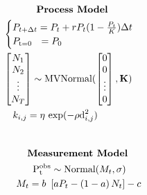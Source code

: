 \documentclass[12pt,preview,border=0]{standalone}
\begin{document}
$$
\begin{aligned} 
    & \hphantom{xxxxxx} \text{\centering \textbf{Process Model}} \\
    &\begin{cases}
        P_{t + \Delta t} = P_t + r P_t (1 - \frac{P_t}{K}) \Delta t \\
        P_\text{t=0}  ~~ = P_0 \\
    \end{cases} 
    \\
    &\begin{bmatrix}
        N_1 \\
        N_2 \\
        \vdots \\
        N_T
    \end{bmatrix} \sim \text{MVNormal}( 
        \begin{bmatrix}
            0 \\
            0 \\
            \vdots \\
            0
        \end{bmatrix}, 
    \textbf{K} ) 
    \\
    & ~~~ k_{i,j} = \eta ~ \text{exp}( -\rho \text{d}^\text{2}_{i,j} ) \\
    \end{aligned}
$$
\\
$$
\begin{aligned}
    & \hphantom{xxxx} \text{\centering \textbf{Measurement Model}} \\
    & \hphantom{xxxxx} \mathrm{ P_{t}^{obs} }  \sim \text{Normal}( M_t, \sigma )  \\
    & \hphantom{xx} M_t                     =  b ~ \left[ a P_t - \left( 1 - a \right) N_t \right] - c 
\end{aligned}
$$
\end{document}
